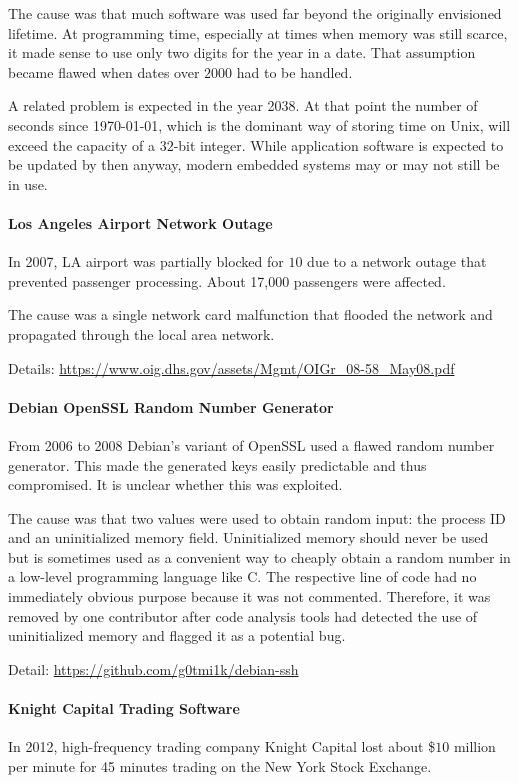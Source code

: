 The cause was that much software was used far beyond the originally envisioned lifetime.
At programming time, especially at times when memory was still scarce, it made sense to use only two digits for the year in a date.
That assumption became flawed when dates over $2000$ had to be handled.

A related problem is expected in the year 2038.
At that point the number of seconds since 1970-01-01, which is the dominant way of storing time on Unix, will exceed the capacity of a $32$-bit integer.
While application software is expected to be updated by then anyway, modern embedded systems may or may not still be in use.

\paragraph{Los Angeles Airport Network Outage}
In 2007, LA airport was partially blocked for $10$ due to a network outage that prevented passenger processing.
About 17,000 passengers were affected.

The cause was a single network card malfunction that flooded the network and propagated through the local area network.

Details: \url{https://www.oig.dhs.gov/assets/Mgmt/OIGr_08-58_May08.pdf}

\paragraph{Debian OpenSSL Random Number Generator}
From 2006 to 2008 Debian's variant of OpenSSL used a flawed random number generator.
This made the generated keys easily predictable and thus compromised.
It is unclear whether this was exploited.

The cause was that two values were used to obtain random input: the process ID and an uninitialized memory field.
Uninitialized memory should never be used but is sometimes used as a convenient way to cheaply obtain a random number in a low-level programming language like C.
The respective line of code had no immediately obvious purpose because it was not commented.
Therefore, it was removed by one contributor after code analysis tools had detected the use of uninitialized memory and flagged it as a potential bug.

Detail: \url{https://github.com/g0tmi1k/debian-ssh}

\paragraph{Knight Capital Trading Software}
In 2012, high-frequency trading company Knight Capital lost about \$$10$ million per minute for 45 minutes trading on the New York Stock Exchange.

